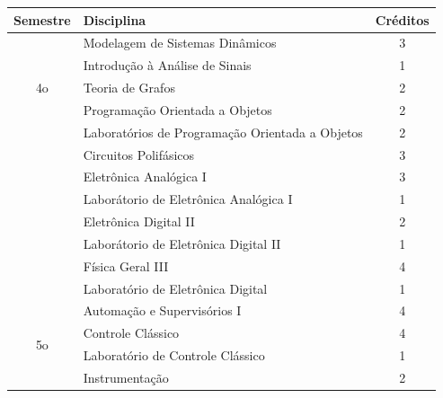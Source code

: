 \documentclass[12pt]{article} %
\begin{document}
\begin{table}[H]
\centering
\begin{tabular}{|c|l|c|}
\hline
Semestre             & Disciplina                                                 & Créditos \\ \hline

\multirow{5}{*}{4o}  
					& Modelagem de Sistemas Dinâmicos                                       & 3        \\ \cline{2-3} 
				    & Introdução à Análise de Sinais                                        			& 1        \\ \cline{2-3} 
				    & Teoria de Grafos                                        								& 2        \\ \cline{2-3} 
				    & Programação Orientada a Objetos                                          & 2        \\ \cline{2-3}
				    & Laboratórios de Programação Orientada a Objetos               & 2        \\ \cline{2-3}  
					& Circuitos Polifásicos                                   							& 3        \\ \cline{2-3} 
                      	& Eletrônica Analógica I                                     						& 3        \\ \cline{2-3} 
                      & Laborátorio de Eletrônica Analógica I                                   & 1        \\ \cline{2-3} 
                      & Eletrônica Digital II                                     & 2        \\ \cline{2-3} 
                      & Laborátorio de Eletrônica Digital II                                   & 1        \\ \cline{2-3} 
					& Física Geral III                                                & 4        \\ \cline{2-3} 
                      & Laboratório de Eletrônica Digital                                                 & 1        \\ \hline
\multirow{5}{*}{5o}  
					& Automação e Supervisórios I                                      			& 4        \\ \cline{2-3} 
				    & Controle Clássico                                        							& 4        \\ \cline{2-3} 
				    & Laboratório de Controle Clássico                                        	& 1        \\ \cline{2-3} 
				    & Instrumentação							                                             & 2        \\ \cline{2-3}

\end{tabular}
\end{table}
\end{document}
